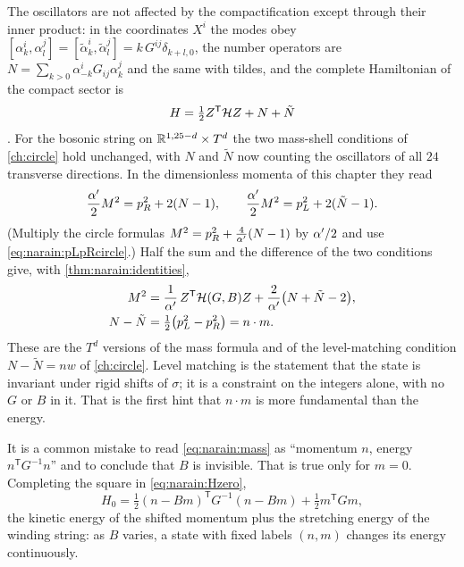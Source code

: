 The oscillators are not affected by the compactification except through their inner product:
in the coordinates $X^i$ the modes obey
$[\alpha^i_k,\alpha^j_l]=[\tilde\alpha^i_k,\tilde\alpha^j_l]=k\,G^{ij}\delta_{k+l,0}$, the
number operators are $N=\sum_{k>0}\alpha^i_{-k}G_{ij}\alpha^j_k$ and the same with tildes,
and the complete Hamiltonian of the compact sector is
\begin{equation}\label{eq:narain:Hfull}
 H=\tfrac12Z^{\mathsf T}\mathcal{H} Z+N+\tilde N
\end{equation}
. For the bosonic string on
$\mathbb{R}^{1,25-d}\times T^d$ the two mass-shell conditions of \cref{ch:circle} hold unchanged, with
$N$ and $\tilde N$ now counting the oscillators of all $24$ transverse directions. In the
dimensionless momenta of this chapter they read
\begin{equation}\label{eq:narain:massLR}
 \frac{\alpha'}2M^2=p_R^2+2(N-1),\qquad\frac{\alpha'}2M^2=p_L^2+2(\tilde N-1).
\end{equation}
(Multiply the circle formulas $M^2=p_R^2+\frac4{\alpha'}(N-1)$ by $\alpha'/2$ and use
\eqref{eq:narain:pLpRcircle}.) Half the sum and the difference of the two conditions give,
with \cref{thm:narain:identities},
\begin{align}
 M^2&=\frac1{\alpha'}\,Z^{\mathsf T}\mathcal{H}(G,B)Z+\frac2{\alpha'}\big(N+\tilde N-2\big),\label{eq:narain:mass}\\
 N-\tilde N&=\tfrac12\big(p_L^2-p_R^2\big)=n\cdot m .\label{eq:narain:level}
\end{align}
These are the $T^d$ versions of the mass formula and of the level-matching
condition $N-\tilde N=nw$ of \cref{ch:circle}. Level matching is the
statement that the state is invariant under rigid shifts of $\sigma$; it is a constraint on the
integers alone, with no $G$ or $B$ in it. That is the first hint that $n\cdot m$ is more
fundamental than the energy.

It is a common mistake to read \eqref{eq:narain:mass} as ``momentum $n$, energy
$n^{\mathsf T}G^{-1}n$'' and to conclude that $B$ is invisible. That is true only for $m=0$.
Completing the square in \eqref{eq:narain:Hzero},
\begin{equation}\label{eq:narain:square}
 H_0=\tfrac12(n-Bm)^{\mathsf T}G^{-1}(n-Bm)+\tfrac12m^{\mathsf T}Gm ,
\end{equation}
the kinetic energy of the shifted momentum plus the stretching energy of the winding string:
as $B$ varies, a state with fixed labels $(n,m)$ changes its energy continuously.

